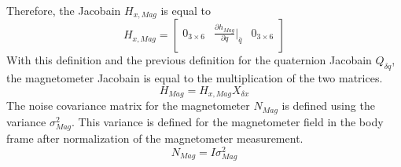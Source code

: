 Therefore, the Jacobain $H_{x,Mag}$ is equal to
\begin{equation}
    H_{x,Mag} = \begin{bmatrix}
        0_{3 \times 6} & \frac{\partial h_{Mag}}{\partial q} \bigg|_{\bar{q}} & 0_{3 \times 6} \\
    \end{bmatrix}
    \label{eq: H_x mag}
\end{equation}
With this definition and the previous definition for the quaternion Jacobain $Q_{\delta q}$, the magnetometer Jacobain is equal to the multiplication of the two matrices.
\begin{equation}
    H_{Mag} = H_{x,Mag} X_{\delta x}
    \label{eq: H mag quaternion}
\end{equation}
The noise covariance matrix for the magnetometer $N_{Mag}$ is defined using the variance $\sigma_{Mag}^2$. This variance is defined for the magnetometer field in the body frame after normalization of the magnetometer measurement.
\begin{equation}
    N_{Mag} = I \sigma_{Mag}^2
    \label{eq: N mag quaternion}
\end{equation}


